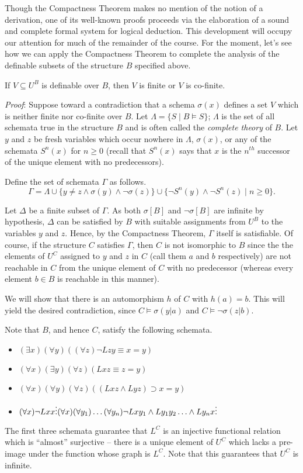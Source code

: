Though the Compactness Theorem makes no mention of the notion of a derivation, one of its well-known proofs proceeds via the elaboration of a sound and complete formal system for logical deduction. This development will occupy our attention for much of the remainder of the course. For the moment, let's see how we can apply the Compactness Theorem to complete the analysis of the definable subsets of the structure $B$ specified above.
\begin{theorem}
If $V\subseteq U^B$ is definable over $B$, then $V$ is finite or $V$ is co-finite.
\end{theorem}
\emph{Proof}:
Suppose toward a contradiction that a schema $\sigma(x)$ defines a set $V$ which is neither finite nor co-finite over $B$. Let $\Lambda = \{ S\mid B\models S\}$; $\Lambda$ is the set of all schemata true in the structure $B$ and is often called the \emph{complete theory} of $B$. Let $y$ and $z$ be fresh variables which occur nowhere in $\Lambda$, $\sigma(x)$, or any of the schemata $S^n(x)$ for $n\geq 0$ (recall that $S^n(x)$ says that $x$ is the $n^{th}$ successor of the unique element with no predecessors). 

Define the set of schemata $\Gamma$ as follows.
\[
\Gamma = \Lambda\cup\{y\neq z \land \sigma(y) \land \neg \sigma(z)\}\cup\{\neg S^n(y) \land \neg S^n(z)\mid n\geq 0\}.
\]

Let $\Delta$ be a finite subset of $\Gamma$. As both $\sigma[B]$ and $\neg \sigma[B]$ are infinite by hypothesis, $\Delta$ can be satisfied by $B$ with suitable assignments from $U^B$ to the variables $y$ and $z$. Hence, by the Compactness Theorem, $\Gamma$ itself is satisfiable. Of course, if the structure $C$ satisfies $\Gamma$, then $C$ is not isomorphic to $B$ since the the elements of $U^C$ assigned to $y$ and $z$ in $C$ (call them $a$ and $b$ respectively) are not reachable in $C$ from the unique element of $C$ with no predecessor (whereas every element $b \in B$ is reachable in this manner). 

We will show that there is an automorphism $h$ of $C$ with $h(a)=b$. This will yield the desired  contradiction, since $C\models \sigma(y|a)$ and $C\models \neg \sigma(z|b)$. 

Note that $B$, and hence $C$, satisfy the following schemata.
\begin{itemize}
\item
$(\exists x)(\forall y)((\forall z)\neg Lzy \equiv x=y)$
\item
$(\forall x)(\exists y)(\forall z)(Lxz\equiv z=y)$
\item
$(\forall x)(\forall y)(\forall z)((Lxz\wedge Lyz)\supset x=y)$
\item
$(\forall x)\neg Lxx\\
\vdots\\
(\forall x)(\forall y_1)\ldots(\forall y_n)\neg Lxy_1\wedge Ly_1y_2\ldots\wedge Ly_nx\\
\vdots$
\end{itemize} 
The first three schemata guarantee that $L^C$ is an injective functional relation which is ``almost'' surjective -- there is a unique element of $U^C$ which lacks a pre-image under the function whose graph is $L^C$. Note that this guarantees that $U^C$ is infinite. 

